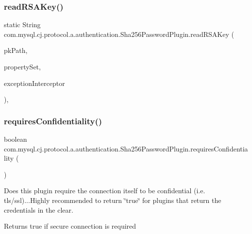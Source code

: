 \subsubsection{\texorpdfstring{read\+R\+S\+A\+Key()}{readRSAKey()}}
{\footnotesize\ttfamily static String com.\+mysql.\+cj.\+protocol.\+a.\+authentication.\+Sha256\+Password\+Plugin.\+read\+R\+S\+A\+Key (\begin{DoxyParamCaption}\item[{String}]{pk\+Path,  }\item[{\mbox{\hyperlink{interfacecom_1_1mysql_1_1cj_1_1conf_1_1_property_set}{Property\+Set}}}]{property\+Set,  }\item[{\mbox{\hyperlink{interfacecom_1_1mysql_1_1cj_1_1exceptions_1_1_exception_interceptor}{Exception\+Interceptor}}}]{exception\+Interceptor }\end{DoxyParamCaption})\hspace{0.3cm}{\ttfamily [static]}, {\ttfamily [protected]}}

\mbox{\label{classcom_1_1mysql_1_1cj_1_1protocol_1_1a_1_1authentication_1_1_sha256_password_plugin_a13372ce1bdd725d30b81b938202e5cdc}} 
\subsubsection{\texorpdfstring{requires\+Confidentiality()}{requiresConfidentiality()}}
{\footnotesize\ttfamily boolean com.\+mysql.\+cj.\+protocol.\+a.\+authentication.\+Sha256\+Password\+Plugin.\+requires\+Confidentiality (\begin{DoxyParamCaption}{ }\end{DoxyParamCaption})}

Does this plugin require the connection itself to be confidential (i.\+e. tls/ssl)...Highly recommended to return \char`\"{}true\char`\"{} for plugins that return the credentials in the clear.

\begin{DoxyReturn}{Returns}
true if secure connection is required 
\end{DoxyReturn}


